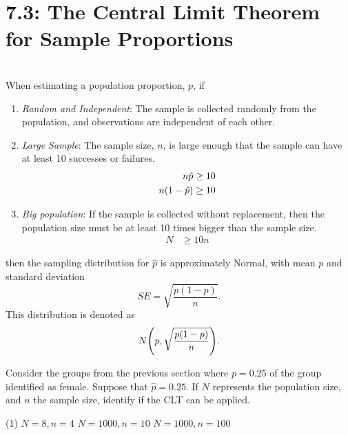 \documentclass[../mathNotesPreamble]{subfiles}
\begin{document}
  \section{7.3: The Central Limit Theorem for Sample Proportions}
  \begin{defn*}\mbox{}\\
    When estimating a population proportion, $p$, if
    \begin{enumerate}
      \item \emph{Random and Independent}: The sample is collected randomly from the population, and observations are independent of each other.
      \item \emph{Large Sample}: The sample size, $n$, is large
        enough that the sample can have at least 10 successes or
        failures.
        \begin{align*}
          n\hat{p}&\geq 10\\
          n{\left(1-\hat{p}\right)}&\geq 10
        \end{align*}
      \item \emph{Big population}: If the sample is collected
        without replacement, then the population size must be at
        least 10 times bigger than the sample size.
        \begin{align*}
          N&\geq 10n
        \end{align*}
    \end{enumerate}
    then the sampling distribution for $\hat{p}$ is approximately Normal, with mean $p$ and standard deviation
      \[SE=\sqrt{\frac{p(1-p)}{n}}.\]
    This distribution is denoted as
      \[N{\left(p,\sqrt{\frac{p(1-p)}{n}}\right)}.\]
  \end{defn*}
  \pagebreak

  \begin{ex*}
    Consider the groups from the previous section where $p=0.25$ of the group identified as female. Suppose that $\hat{p}=0.25$. If $N$ represents the population size, and $n$ the sample size, identify if the CLT can be applied.
  \end{ex*}
  \begin{extasks}[after-item-skip=\stretch{1}](1)
    \task $N=8, n=4$
    \task $N=1000, n=10$
    \task $N=1000, n=100$
  \end{extasks}
  \pagebreak
\end{document}
